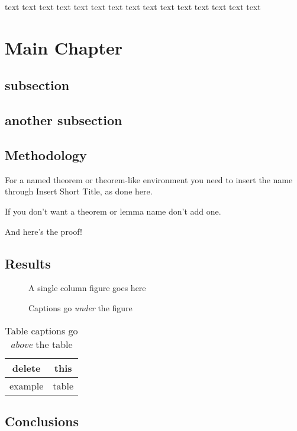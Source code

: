 \documentclass{ua_wgs_base}
\begin{document}
text text text text text text text text text text text text text text
text

\chapter{Main Chapter}

\section{subsection}

\section{another subsection}

\section{Methodology}

For a named theorem or theorem-like environment you need to insert
the name through \textsf{Insert Short Title}, as done here.

If you don't want a theorem or lemma name don't add one.

And here's the proof!

\section{Results}

\begin{figure}[htbp]
\begin{centering}
\textsf{A single column figure goes here}
\par\end{centering}
\caption{Captions go \emph{under} the figure}
\end{figure}
\begin{table}[htbp]
\caption{Table captions go \emph{above} the table}

\centering{}%
\begin{tabular}{|c|c|}
\hline 
delete & this\tabularnewline
\hline 
\hline 
example & table\tabularnewline
\hline 
\end{tabular}
\end{table}


\section{Conclusions}
\end{document}
